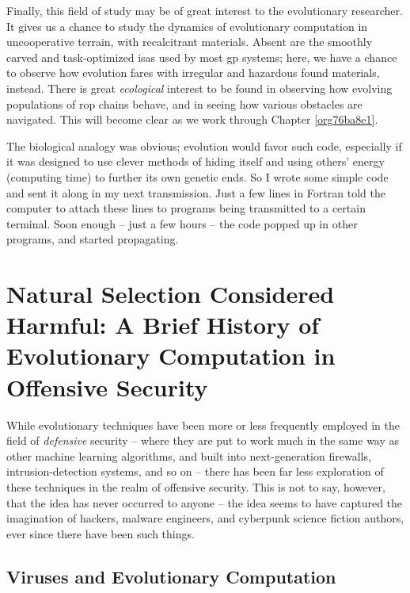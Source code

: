 \documentclass[12pt,glossary]{dalthesis}
\begin{document}
Finally, this field of study may be of great interest to the evolutionary researcher.
It gives us a chance to study the dynamics of evolutionary computation in 
uncooperative terrain, with recalcitrant materials. Absent are the smoothly
carved and task-optimized \glspl{isa} used by most \gls{gp} systems; here, we have a 
chance to observe how evolution fares with irregular and hazardous found materials,
instead. There is great \emph{ecological} interest to be found in observing how evolving
populations of \gls{rop} chains behave, and in seeing how various obstacles are navigated.
This will become clear as we work through Chapter \ref{org76ba8e1}.










\begin{savequote}
The biological analogy was obvious; evolution would favor such code,
especially if it was designed to use clever methods of hiding itself and using
others' energy (computing time) to further its own genetic ends. So I wrote some
simple code and sent it along in my next transmission. Just a few lines in
Fortran told the computer to attach these lines to programs being transmitted to
a certain terminal. Soon enough -- just a few hours -- the code popped up in
other programs, and started propagating.
\end{savequote}
\chapter{Natural Selection Considered Harmful: A Brief History of Evolutionary Computation in Offensive Security}
\label{sec:org68089b8}
\label{org0c6862d}
\label{orgf57ec96}

While evolutionary techniques have been more or less frequently employed in the
field of \emph{defensive} security -- where they are put to work much in the same way
as other machine learning algorithms, and built into next-generation firewalls,
intrusion-detection systems, and so on -- there has been far less exploration of
these techniques in the realm of offensive security. This is not to say,
however, that the idea has never occurred to anyone -- the idea seems to have
captured the imagination of hackers, malware engineers, and cyberpunk science
fiction authors, ever since there have been such things.

\section{Viruses and Evolutionary Computation}
\label{sec:org876dbff}
\label{org8292402}
\end{document}
